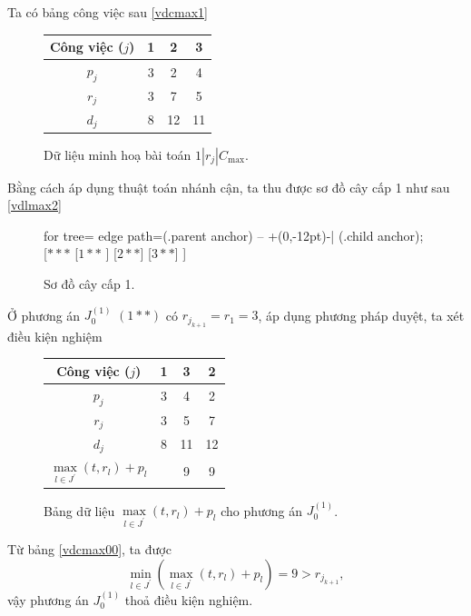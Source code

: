 \begin{vd} \label{vdrjcmax1}
Ta có bảng công việc sau \eqref{vdcmax1}

\begin{figure}[h!]
	\centering
	\begin{tabular}{|c | c c c |} 
	\hline
	Công việc ($j$) & 1 & 2 & 3 \\
	\hline\hline
	$p_j$ & 3 & 2 & 4 \\
	$r_j$ & 3 & 7 & 5 \\
	$d_j$ & 8 & 12 & 11 \\
	\hline
	\end{tabular}
\caption{\label{vdcmax1} Dữ liệu minh hoạ bài toán $1 | r_j | C_{\max}$.}
\end{figure}



Bằng cách áp dụng thuật toán nhánh cận, ta thu được sơ đồ cây cấp 1 như sau \eqref{vdlmax2}


\begin{figure}[h!]
	\centering
	\begin{forest} for tree={
		edge path={\noexpand{} (.parent anchor) -- +(0,-12pt)-| (.child anchor);}
	}
	[{$***$}
		[$1**$
		]
		[$2**$]
		[$3**$]
	]
	\end{forest}
\caption{\label{vdlmax2} Sơ đồ cây cấp 1.}
\end{figure}

Ở phương án $J_0^{(1)}$ $(1**)$ có $r_{j_{k+1}} = r_1 = 3$, áp dụng phương pháp duyệt, ta xét điều kiện nghiệm

\begin{figure}[h!]
	\centering
	\begin{tabular}{|c | c c c |} 
	\hline
	Công việc ($j$) & 1 & 3 & 2 \\
	\hline\hline
	$p_j$ & 3 & 4 & 2 \\
	$r_j$ & 3 & 5 & 7 \\
	$d_j$ & 8 & 11 & 12 \\
	$\underset{l \in J^{'}}{\max} (t, r_l) + p_l$ & & 9 & 9 \\ 
	\hline
	\end{tabular}
\caption{\label{vdcmax00} Bảng dữ liệu $\underset{l \in J^{'}}{\max} (t, r_l) + p_l$ cho phương án $J_0^{(1)}$.}
\end{figure}

Từ bảng \eqref{vdcmax00}, ta được
\begin{equation*}
\underset{l \in J^{'}}{\min} (\underset{l \in J^{'}}{\max} (t, r_l) + p_l) = 9 > r_{j_{k+1}},
\end{equation*}
vậy phương án $J_0^{(1)}$ thoả điều kiện nghiệm.


\end{vd}
